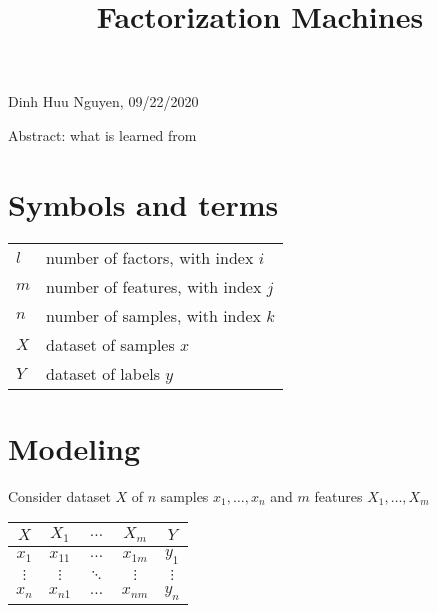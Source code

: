 \documentclass[14pt, reqno]{amsart}
\title{Factorization Machines}
\theoremstyle{definition}
\begin{document}
\maketitle

\begin{center}
Dinh Huu Nguyen, 09/22/2020
\end{center}

Abstract: what is learned from \cite{factorization_machines}
\vspace{20pt}

\tableofcontents

\section{Symbols and terms}
 \begin{tabular}{l l}
$l$ & number of factors, with index $i$ \\
$m$ & number of features, with index $j$ \\
$n$ & number of samples, with index $k$ \\
$X$ & dataset of samples $x$ \\
$Y$ & dataset of labels $y$ \\
\end{tabular}

\vfill
\pagebreak

\section{Modeling} Consider dataset $X$ of $n$ samples $x_1, \dots , x_n$ and $m$ features $X_1, \dots, X_m$
\vspace{10pt}
\begin{center}
\begin{tabular}{c | c c c | c}
$X$ & $X_1$ & $\dots$ & $X_m$ & $Y$ \\
\hline
$x_1$ & $x_{11}$ & $\dots$ & $x_{1m}$ & $y_1$ \\
$\vdots$ & $\vdots$ & $\ddots$ & $\vdots$ & $\vdots$ \\
$x_n$ & $x_{n1}$ & $\dots$ & $x_{nm}$ & $y_n$ \\
\end{tabular}
\end{center}
\vspace{10pt}

\vfill
\pagebreak
\end{document}
